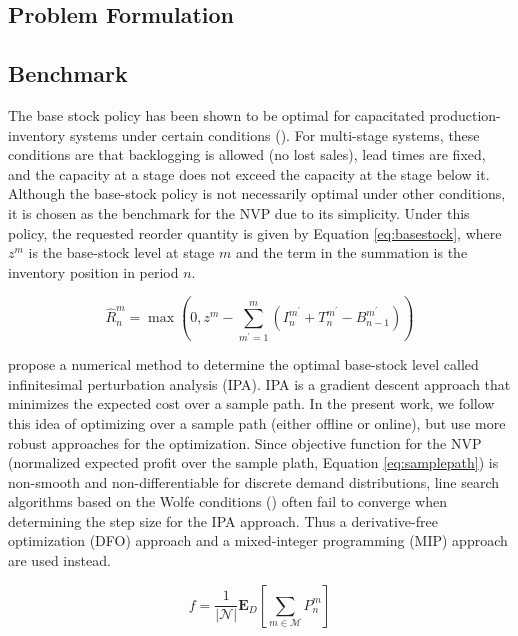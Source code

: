 \documentclass[12pt]{article}
\begin{document}
\subsection{Problem Formulation}

\subsection{Benchmark}

The base stock policy has been shown to be optimal for capacitated production-inventory systems under certain conditions (\cite{Kapuscinski1999OptimalSystems}). For multi-stage systems, these conditions are that backlogging is allowed (no lost sales), lead times are fixed, and the capacity at a stage does not exceed the capacity at the stage below it. Although the base-stock policy is not necessarily optimal under other conditions, it is chosen as the benchmark for the NVP due to its simplicity. Under this policy, the requested reorder quantity is given by Equation \ref{eq:basestock}, where $z^m$ is the base-stock level at stage $m$ and the term in the summation is the inventory position in period $n$.  

\begin{equation}
    \hat{R}^m_n = \max\left(0,z^m - \sum_{m^\prime = 1}^m \left(I^{m^\prime}_n + T^{m^\prime}_n - B^{m^\prime}_{n-1}\right)\right)
    \label{eq:basestock}
\end{equation}

\cite{Glasserman1995SensitivitySystems} propose a numerical method to determine the optimal base-stock level called infinitesimal perturbation analysis (IPA). IPA is a gradient descent approach that minimizes the expected cost over a sample path. In the present work, we follow this idea of optimizing over a sample path (either offline or online), but use more robust approaches for the optimization. Since objective function for the NVP (normalized expected profit over the sample plath, Equation \ref{eq:samplepath}) is non-smooth and non-differentiable for discrete demand distributions, line search algorithms based on the Wolfe conditions (\cite{Nocedal2006NumericalOptimization}) often fail to converge when determining the step size for the IPA approach. Thus a derivative-free optimization (DFO) approach and a mixed-integer programming (MIP) approach are used instead. 

\begin{equation}
    f = \frac{1}{|\mathcal{N}|} \mathbf{E}_D \left[\sum_{m\in \mathcal{M}} P^m_n\right]
    \label{eq:samplepath}
\end{equation}
\end{document}
